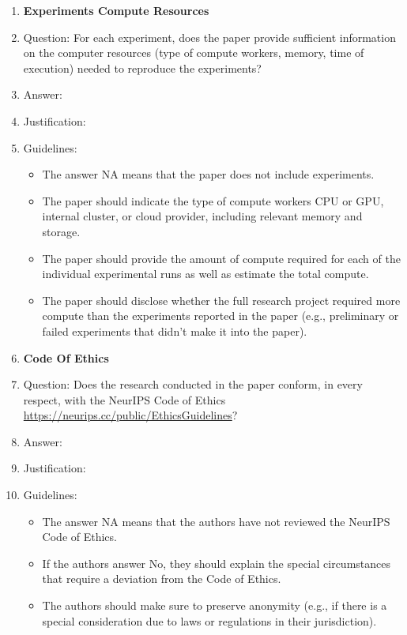 \documentclass{article}
\begin{document}
\begin{enumerate}
\item {\bf Experiments Compute Resources}
    \item[] Question: For each experiment, does the paper provide sufficient information on the computer resources (type of compute workers, memory, time of execution) needed to reproduce the experiments?
    \item[] Answer: \answerTODO{} %
    \item[] Justification: \justificationTODO{}
    \item[] Guidelines:
    \begin{itemize}
        \item The answer NA means that the paper does not include experiments.
        \item The paper should indicate the type of compute workers CPU or GPU, internal cluster, or cloud provider, including relevant memory and storage.
        \item The paper should provide the amount of compute required for each of the individual experimental runs as well as estimate the total compute. 
        \item The paper should disclose whether the full research project required more compute than the experiments reported in the paper (e.g., preliminary or failed experiments that didn't make it into the paper). 
    \end{itemize}
    
\item {\bf Code Of Ethics}
    \item[] Question: Does the research conducted in the paper conform, in every respect, with the NeurIPS Code of Ethics \url{https://neurips.cc/public/EthicsGuidelines}?
    \item[] Answer: \answerTODO{} %
    \item[] Justification: \justificationTODO{}
    \item[] Guidelines:
    \begin{itemize}
        \item The answer NA means that the authors have not reviewed the NeurIPS Code of Ethics.
        \item If the authors answer No, they should explain the special circumstances that require a deviation from the Code of Ethics.
        \item The authors should make sure to preserve anonymity (e.g., if there is a special consideration due to laws or regulations in their jurisdiction).
    \end{itemize}



\end{enumerate}
\end{document}

